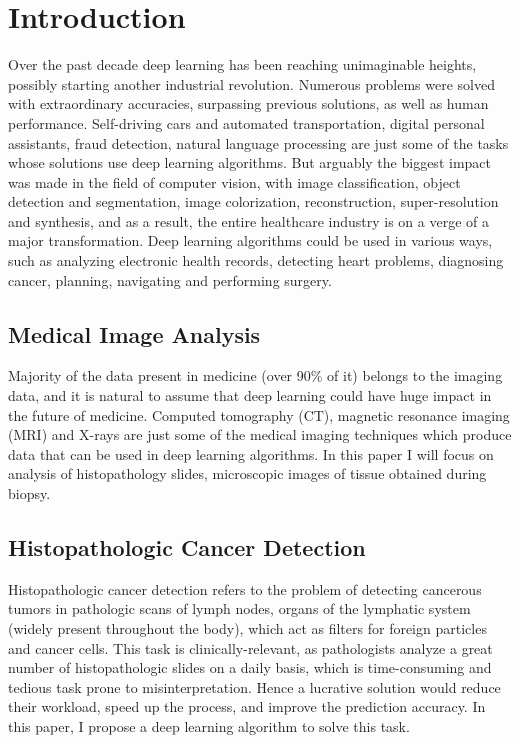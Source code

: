 \chapter{Introduction}
\label{ch:intro}

Over the past decade deep learning has been reaching unimaginable heights, possibly starting another industrial revolution. Numerous problems were solved with extraordinary accuracies, surpassing previous solutions, as well as human performance. Self-driving cars and automated transportation, digital personal assistants, fraud detection, natural language processing are just some of the tasks whose solutions use deep learning algorithms. But arguably the biggest impact was made in the field of computer vision, with image classification, object detection and segmentation, image colorization, reconstruction, super-resolution and synthesis, and as a result, the entire healthcare industry is on a verge of a major transformation. Deep learning algorithms could be used in various ways, such as analyzing electronic health records, detecting heart problems, diagnosing cancer, planning, navigating and performing surgery.

\section{Medical Image Analysis}

Majority of the data present in medicine (over 90\% of it) belongs to the imaging data, and it is natural to assume that deep learning could have huge impact in the future of medicine. Computed tomography (CT), magnetic resonance imaging (MRI) and X-rays are just some of the medical imaging techniques which produce data that can be used in deep learning algorithms. In this paper I will focus on analysis of histopathology slides, microscopic images of tissue obtained during biopsy.

\section{Histopathologic Cancer Detection}
Histopathologic cancer detection refers to the problem of detecting cancerous tumors in pathologic scans of lymph nodes, organs of the lymphatic system (widely present throughout the body), which act as filters for foreign particles and cancer cells. This task is clinically-relevant, as pathologists analyze a great number of histopathologic slides on a daily basis, which is time-consuming and tedious task prone to misinterpretation. Hence a lucrative solution would reduce their workload, speed up the process, and improve the prediction accuracy. In this paper, I propose a deep learning algorithm to solve this task.

